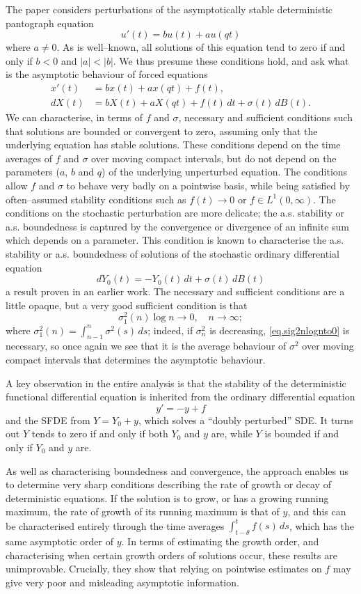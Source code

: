 \documentclass[a4paper,10pt,reqno]{amsart}
\numberwithin{equation}{section}
\theoremstyle{definition}
\theoremstyle{remark}
\DeclareMathOperator{\1}{\mathbbm 1}
\begin{document}
The paper considers perturbations of the asymptotically stable deterministic pantograph equation 
\[
u'(t)=bu(t)+au(qt)
\]
where $a\neq 0$. As is well--known, all solutions of this equation tend to zero if and only if $b<0$ and $|a|<|b|$. We thus presume these conditions hold, and ask what is the asymptotic behaviour of forced equations 
\begin{align*}
x'(t)&=bx(t)+ax(qt)+f(t), \\
dX(t)&=bX(t)+aX(qt)+f(t)\,dt +\sigma(t)\,dB(t).
\end{align*}  
We can characterise, in terms of $f$ and $\sigma$, necessary and sufficient conditions such that solutions are bounded or convergent to zero, assuming only that the underlying equation has stable solutions. These conditions depend on the time averages of $f$ and $\sigma$ over moving compact intervals, but do not depend on the parameters ($a$, $b$ and $q$) of the underlying unperturbed equation.
The conditions allow $f$ and $\sigma$ to behave very badly on a pointwise basis, while being satisfied by often--assumed stability conditions such as $f(t)\to 0$ or $f\in L^1(0,\infty)$. The conditions on the stochastic perturbation are more delicate; the a.s. stability or a.s. boundedness is captured by the convergence or divergence of an infinite sum which depends on a parameter. This condition is known to characterise the a.s. stability or a.s. boundedness of solutions of the stochastic ordinary differential equation
\[
dY_0(t)=-Y_0(t)\,dt + \sigma(t)\,dB(t)
\]
a result proven in an earlier work. The necessary and sufficient conditions are a little opaque, but a very good sufficient condition is that 
\begin{equation} \label{eq.sig2nlognto0}
\sigma_1^2(n) \log n\to 0, \quad n\to\infty;
\end{equation}
where $\sigma_1^2(n)=\int_{n-1}^{n} \sigma^2(s)\,ds$; 
indeed, if $\sigma^2_n$ is decreasing, \eqref{eq.sig2nlognto0} is necessary, so once again we see that it is the average behaviour of $\sigma^2$ over moving compact intervals that determines the asymptotic behaviour. 

A key observation in the entire analysis is that the stability of the deterministic functional differential equation is inherited from the ordinary differential equation 
\[
y'=-y+f
\] 
and the SFDE from $Y=Y_0+y$, which solves a ``doubly perturbed'' SDE. It turns out $Y$ tends to zero if and only if both $Y_0$ and $y$ are, while $Y$ is bounded if and only if $Y_0$ and $y$ are.   

As well as characterising boundedness and convergence, the approach enables us to determine very sharp conditions describing the rate of growth or decay of deterministic equations. If the solution is to grow, or has a growing running maximum, the rate of growth of its running maximum is that of $y$, and this can be characterised entirely through the time averages $\int_{t-\theta}^t f(s)\,ds$, which has the same asymptotic order of $y$. In terms of estimating the growth order, and characterising when certain growth orders of solutions occur, these results are unimprovable. Crucially, they show that relying on pointwise estimates on $f$ may give very poor and misleading asymptotic information. 
\end{document}

